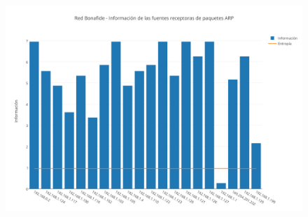 \begin{figure}[h!]
    \centering                                                       
    \includegraphics[width=400pt]{img/RedBonafideFuentesReceptorasARP}
    \caption{}
    \label{bonafideReceptoras}
\end{figure}








